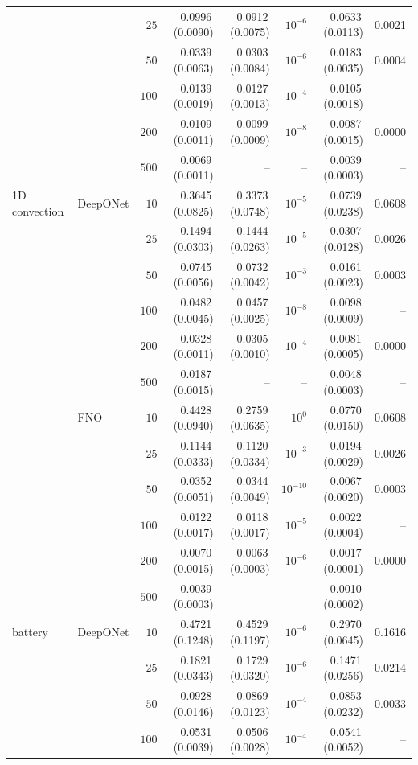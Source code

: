 \documentclass{article}
\begin{document}
{\begin{longtable}{llrrrrrr}
 &  & $25$ & 0.0996\,(0.0090) & 0.0912\,(0.0075) & $10^{-6}$ & 0.0633\,(0.0113) & 0.0021\\
 &  & $50$ & 0.0339\,(0.0063) & 0.0303\,(0.0084) & $10^{-6}$ & 0.0183\,(0.0035) & 0.0004\\
 &  & $100$ & 0.0139\,(0.0019) & 0.0127\,(0.0013) & $10^{-4}$ & 0.0105\,(0.0018) & --\\
 &  & $200$ & 0.0109\,(0.0011) & 0.0099\,(0.0009) & $10^{-8}$ & 0.0087\,(0.0015) & 0.0000\\
 &  & $500$ & 0.0069\,(0.0011) & -- & -- & 0.0039\,(0.0003) & --\\
1D convection & DeepONet & $10$ & 0.3645\,(0.0825) & 0.3373\,(0.0748) & $10^{-5}$ & 0.0739\,(0.0238) & 0.0608\\
 &  & $25$ & 0.1494\,(0.0303) & 0.1444\,(0.0263) & $10^{-5}$ & 0.0307\,(0.0128) & 0.0026\\
 &  & $50$ & 0.0745\,(0.0056) & 0.0732\,(0.0042) & $10^{-3}$ & 0.0161\,(0.0023) & 0.0003\\
 &  & $100$ & 0.0482\,(0.0045) & 0.0457\,(0.0025) & $10^{-8}$ & 0.0098\,(0.0009) & --\\
 &  & $200$ & 0.0328\,(0.0011) & 0.0305\,(0.0010) & $10^{-4}$ & 0.0081\,(0.0005) & 0.0000\\
 &  & $500$ & 0.0187\,(0.0015) & -- & -- & 0.0048\,(0.0003) & --\\
 & FNO & $10$ & 0.4428\,(0.0940) & 0.2759\,(0.0635) & $10^{0}$ & 0.0770\,(0.0150) & 0.0608\\
 &  & $25$ & 0.1144\,(0.0333) & 0.1120\,(0.0334) & $10^{-3}$ & 0.0194\,(0.0029) & 0.0026\\
 &  & $50$ & 0.0352\,(0.0051) & 0.0344\,(0.0049) & $10^{-10}$ & 0.0067\,(0.0020) & 0.0003\\
 &  & $100$ & 0.0122\,(0.0017) & 0.0118\,(0.0017) & $10^{-5}$ & 0.0022\,(0.0004) & --\\
 &  & $200$ & 0.0070\,(0.0015) & 0.0063\,(0.0003) & $10^{-6}$ & 0.0017\,(0.0001) & 0.0000\\
 &  & $500$ & 0.0039\,(0.0003) & -- & -- & 0.0010\,(0.0002) & --\\
battery & DeepONet & $10$ & 0.4721\,(0.1248) & 0.4529\,(0.1197) & $10^{-6}$ & 0.2970\,(0.0645) & 0.1616\\
 &  & $25$ & 0.1821\,(0.0343) & 0.1729\,(0.0320) & $10^{-6}$ & 0.1471\,(0.0256) & 0.0214\\
 &  & $50$ & 0.0928\,(0.0146) & 0.0869\,(0.0123) & $10^{-4}$ & 0.0853\,(0.0232) & 0.0033\\
 &  & $100$ & 0.0531\,(0.0039) & 0.0506\,(0.0028) & $10^{-4}$ & 0.0541\,(0.0052) & --\\

\end{longtable}}
\end{document}
